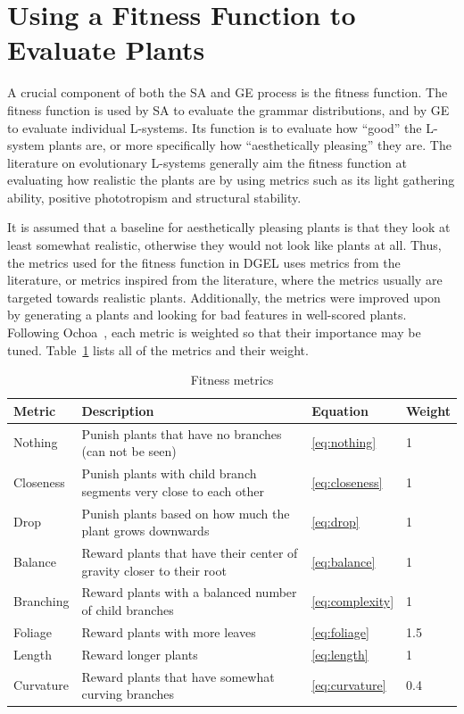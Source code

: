 \section{Using a Fitness Function to Evaluate Plants}
A crucial component of both the \gls{SA} and \gls{GE} process is the fitness function.
The fitness function is used by \gls{SA} to evaluate the grammar distributions, and by \gls{GE} to evaluate individual \glspl{L-system}.
Its function is to evaluate how ``good'' the \gls{L-system} plants are, or more specifically how ``aesthetically pleasing'' they are.
The literature on evolutionary \glspl{L-system} generally aim the fitness function at evaluating how realistic the plants are by using metrics such as its light gathering ability, positive phototropism and structural stability.

It is assumed that a baseline for aesthetically pleasing plants is that they look at least somewhat realistic, otherwise they would not look like plants at all.
Thus, the metrics used for the fitness function in \gls{DGEL} uses metrics from the literature, or metrics inspired from the literature, where the metrics usually are targeted towards realistic plants.
Additionally, the metrics were improved upon by generating a plants and looking for bad features in well-scored plants.
Following Ochoa~\cite{1998Ochoa}, each metric is weighted so that their importance may be tuned.
Table~\ref{tab:fitness} lists all of the metrics and their weight.

\begin{table}
    \centering
    \begin{tabularx}{\textwidth}{| l | X | l | l |}
    \hline
    \textbf{Metric} & \textbf{Description} & \textbf{Equation} & \textbf{Weight} \\
    \hline
    Nothing & Punish plants that have no branches (can not be seen) & \ref{eq:nothing} & 1 \\
    \hline
    Closeness & Punish plants with child branch segments very close to each other & \ref{eq:closeness} & 1 \\
    \hline
    Drop & Punish plants based on how much the plant grows downwards & \ref{eq:drop} & 1 \\
    \hline
    Balance & Reward plants that have their center of gravity closer to their root & \ref{eq:balance} & 1 \\
    \hline
    Branching & Reward plants with a balanced number of child branches & \ref{eq:complexity} & 1 \\
    \hline
    Foliage & Reward plants with more leaves & \ref{eq:foliage} & 1.5 \\
    \hline
    Length & Reward longer plants & \ref{eq:length} & 1 \\
    \hline
    Curvature & Reward plants that have somewhat curving branches & \ref{eq:curvature} & 0.4 \\
    \hline
    \end{tabularx}
    \caption{Fitness metrics}
    \label{tab:fitness}
\end{table}

